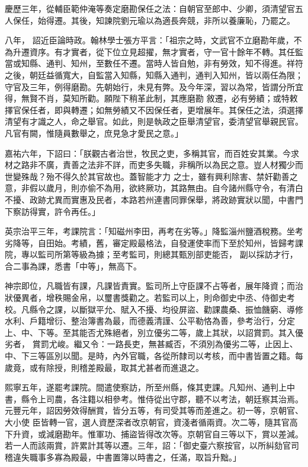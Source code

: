 \begin{pinyinscope}
 慶歷三年，從輔臣範仲淹等奏定磨勘保任之法：自朝官至郎中、少卿，須清望官五人保任，始得遷。其後，知諫院劉元瑜以為適長奔競，非所以養廉恥，乃罷之。



 八年，
 詔近臣論時政。翰林學士張方平言：「祖宗之時，文武官不立磨勘年歲，不為升遷資序。有才實者，從下位立見超擢，無才實者，守一官十餘年不轉。其任監當或知縣、通判、知州，至數任不遷。當時人皆自勉，非有勞效，知不得進。祥符之後，朝廷益循寬大，自監當入知縣，知縣入通判，通判入知州，皆以兩任為限；守官及三年，例得磨勘。先朝始行，未見有弊。及今年深，習以為常，皆謂分所宜得，無賢不肖，莫知所勸。願陛下稍革此制，其應磨勘
 敘遷，必有勞績；或特敕擇官保任者，即與轉遷；如無勞績又不因保任者，更增展年。其保任之法，須選擇清望有才識之人，命之舉官。如此，則是執政之臣舉清望官，委清望官舉親民官。凡官有闕，惟隨員數舉之，庶見急才愛民之意。」



 嘉祐六年，下詔曰：「朕觀古者治世，牧民之吏，多稱其官，而百姓安其業。今求材之路非不廣，責善之法非不詳，而吏多失職，非稱所以為民之意。豈人材獨少而世變殊哉？殆不得久於其官故也。蓋智能才力
 之士，雖有興利除害、禁奸勸善之意，非假以歲月，則亦偷不為用，欲終厥功，其路無由。自今諸州縣守令，有清白不擾、政跡尤異而實惠及民者，本路若州連書同罪保舉，將政跡實狀以聞，中書門下察訪得實，許令再任。」



 英宗治平三年，考課院言：「知磁州李田，再考在劣等。」降監淄州鹽酒稅務。坐考劣降等，自田始。考績，舊，審定殿最格法，自發運使率而下至於知州，皆歸考課院，專以監司所第等級為據；至考監司，則總其甄別部吏能否，
 副以採訪才行，合二事為課，悉書「中等」，無高下。



 神宗即位，凡職皆有課，凡課皆責實。監司所上守臣課不占等者，展年降資；而治狀優異者，增秩賜金帛，以璽書獎勸之。若監司以上，則命御史中丞、侍御史考校。凡縣令之課，以斷獄平允、賦入不擾、均役屏盜、勸課農桑、振恤饑窮、導修水利、戶籍增衍、整治簿書為最，而德義清謹、公平勒恪為善，參考治行，分定上、中、下等。至其能否尤殊絕者，別立優劣二等，歲上其狀，以詔賞罰。其入優劣者，
 賞罰尤峻。繼又令：一路長吏，無甚臧否，不須別為優劣二等，止因上、中、下三等區別以聞。是時，內外官職，各從所隸司以考核，而中書皆置之籍。每歲竟，或有除授，則稽差殿最，取其尤甚者而進退之。



 熙寧五年，遂罷考課院。間遣使察訪，所至州縣，條其吏課。凡知州、通判上中書，縣令上司農，各注籍以相參考。惟侍從出守郡，聽不以考法，朝廷察其治焉。元豐元年，詔因勞效得酬賞，皆分五等，有司受其等而差進之。初一等，京朝官、大小使
 臣皆轉一官，選人資歷深者改京朝官，資淺者循兩資。次二等，隨其官高下升資，或減磨勘年。惟軍功、捕盜皆得改次等。京朝官自三等以下，賞以差減。若一人而該兩賞，許累計其等以遷。三年，詔：「御史臺六察按官，以所糾劾官司稽違失職事多寡為殿最，中書置簿以時書之，任滿，取旨升黜。」




\end{pinyinscope}

